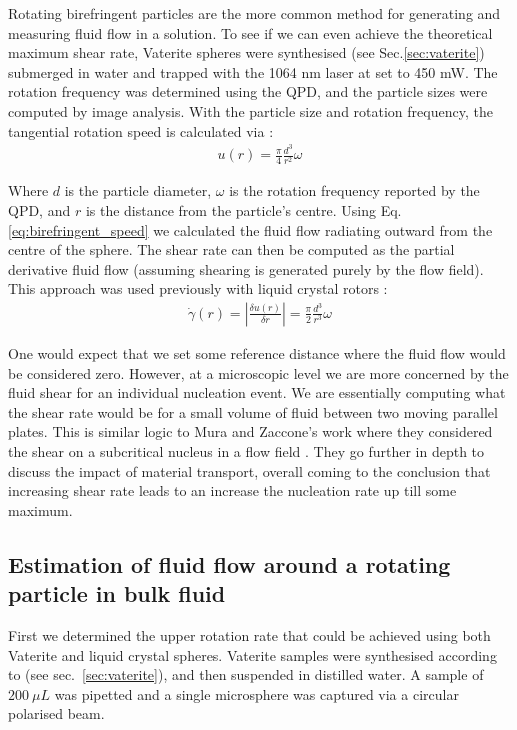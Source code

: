 Rotating birefringent particles are the more common method for generating 
and measuring fluid flow in a solution. To see if we can even achieve the 
theoretical maximum shear rate, Vaterite spheres were synthesised (see 
Sec.\ref{sec:vaterite}) submerged in water and trapped with the 1064 nm 
laser at set to 450 mW. The rotation frequency was determined using the 
QPD, and the particle sizes were computed by image analysis. With the 
particle size and rotation frequency, the tangential rotation speed is 
calculated via \cite{Saito2022}:
\begin{align}
	\label{eq:birefringent_speed}
	u(r) = \frac{\pi}{4}\frac{d^3}{r^2}\omega
\end{align}

Where $d$ is the particle diameter, $\omega$ is the rotation frequency
reported by the QPD, and $r$ is the distance from the particle's centre. 
Using Eq.\ref{eq:birefringent_speed} we calculated the fluid flow radiating
outward from the centre of the sphere. The shear rate can then be computed
as the partial derivative fluid flow (assuming shearing is generated purely
by the flow field). This approach was used previously with liquid crystal 
rotors \cite{Saito2022}:
\begin{align}
	\label{eq:birefringent_shear}
	\dot{\gamma}(r)=\left|\frac{\delta u(r)}{\delta r} \right|= 
	\frac{\pi}{2}\frac{d^3}{r^3}\omega
\end{align}

One would expect that we set some reference distance where the fluid flow 
would be considered zero. However, at a microscopic level we are more 
concerned by the fluid shear for an individual nucleation event. We are
essentially computing what the shear rate would be for a small volume 
of fluid between two moving parallel plates. This is similar logic to Mura 
and Zaccone's work where they considered the shear on a subcritical nucleus
in a flow field \cite{Mura2016}. They go further in depth to discuss the 
impact of material transport, overall coming to the conclusion that 
increasing shear rate leads to an increase the nucleation rate up till some
maximum. 
\subsection{Estimation of fluid flow around a rotating particle in bulk fluid}
First we determined the upper rotation rate that could be achieved 
using both Vaterite and liquid crystal spheres. Vaterite samples 
were synthesised according to \cite{Parkin2009, Bishop2004} (see 
sec.~\ref{sec:vaterite}), and then suspended in distilled water. 
A sample of $200\ \mu L$ was pipetted and a single microsphere was 
captured via a circular polarised beam. 

